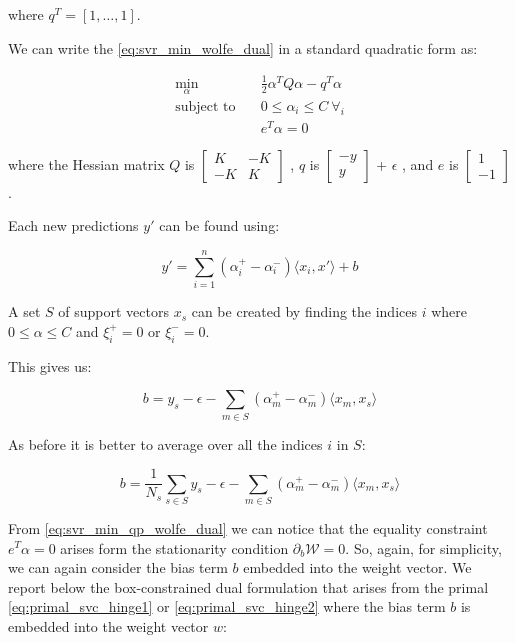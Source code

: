 where $q^T = [1, \dots, 1]$.

We can write the \ref{eq:svr_min_wolfe_dual} in a standard quadratic form as:

\begin{equation}
    \begin{aligned} \label{eq:svr_min_qp_wolfe_dual}
        \min_{\alpha} \quad & \frac{1}{2}\alpha^T Q\alpha-q^T\alpha \\
            \text{subject to} \quad & 0\leq\alpha_i\leq C \ \forall_i \\ & e^T\alpha=0
    \end{aligned}
\end{equation}

where the Hessian matrix $Q$ is 
$
\begin{bmatrix}
K & -K\\
-K & K 
\end{bmatrix}$
, $q$ is 
$
\begin{bmatrix}
-y\\
y
\end{bmatrix}$ + $\epsilon$
, and $e$ is 
$
\begin{bmatrix}
1\\
-1
\end{bmatrix}$.

Each new predictions $y'$ can be found using:

\begin{equation} \label{eq:svr_pred}
    y'= \sum_{i=1}^n (\alpha_i^+ - \alpha_i^-)\langle x_i, x' \rangle+b
\end{equation}

A set $S$ of support vectors $x_s$ can be created by finding the indices $i$ where $0\leq\alpha\leq C$ and $\xi_i^+=0$ or $\xi_i^-=0$.

This gives us:

\begin{equation} \label{eq:svr_b}
    b=y_s-\epsilon-\sum_{m\in S}(\alpha_m^+ -\alpha_m^-) \langle x_m, x_s \rangle
\end{equation}

As before it is better to average over all the indices $i$ in $S$:

\begin{equation} \label{eq:svr_b_avg}
    b=\frac{1}{N_s}\sum_{s\in S}y_s-\epsilon-\sum_{m \in S}(\alpha_m^+ - \alpha_m^-)\langle x_m, x_s \rangle
\end{equation}

From \ref{eq:svr_min_qp_wolfe_dual} we can notice that the equality constraint $e^T \alpha = 0$ arises form the stationarity condition $\partial_{{b}} \mathcal{W}=0$. So, again, for simplicity, we can again consider the bias term $b$ embedded into the weight vector. We report below the box-constrained dual formulation \cite{hsu2002simple} that arises from the primal \ref{eq:primal_svc_hinge1} or \ref{eq:primal_svc_hinge2} where the bias term $b$ is embedded into the weight vector $w$:

